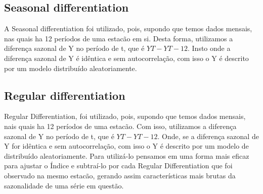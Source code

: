 \documentclass[sigplan,screen]{acmart}
\begin{document}
\subsection{Seasonal differentiation}
A Seasonal differentiation foi utilizado, pois, supondo que temos dados mensais, nas quais ha 12 períodos de uma estacão em si.
Desta forma, utilizamos a diferença sazonal de Y no período de t, que é $YT -YT-12$.
Insto onde a diferença sazonal de Y é idêntica e sem autocorrelação, com isso o Y é descrito por um modelo distribuído aleatoriamente.

\subsection{Regular differentiation}
Regular Differentiation, foi utilizado, pois, supondo que temos dados mensais, nais quais ha 12 períodos de uma estacão.
Com isso, utilizamos a diferença sazonal de Y no período de t, que é $YT -YT-12$.
Onde, se a diferença sazonal de Y for idêntica e sem autocorrelação, com isso o Y é descrito por um modelo de distribuído aleatoriamente.
Para utilizá-lo pensamos em uma forma mais eficaz para ajustar o Índice e subtraí-lo por cada Regular Differentiation que foi observado na mesmo estacão, gerando assim características mais brutas da sazonalidade de uma série em questão.












\end{document}

